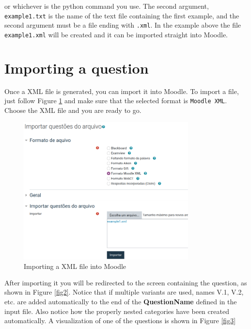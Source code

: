 \documentclass[11pt]{article}
\begin{document}
\noindent or whichever is the python command you use. The second argument, \texttt{example1.txt} is the name of the text file containing the first example, and the second argument must be a file ending with \texttt{.xml}. In the example above the file \texttt{example1.xml} will be created and it can be imported straight into Moodle.


\section{Importing a question}

Once a XML file is generated, you can import it into Moodle. To import a file, just follow Figure \ref{fig1} and make sure that the selected format is \texttt{Moodle XML}. Choose the XML file and  you are ready to go.

\begin{figure}[!htb]
\centering
  \includegraphics[width=0.8\textwidth]{figures/importing.png}
  \caption{Importing a XML file into Moodle}
  \label{fig1}
\end{figure}

After importing it you will be redirected to the screen containing the question, as shown in Figure \ref{fig2}. Notice that if multiple variants are used, names V.1, V.2, etc. are added automatically to the end of the {\bf QuestionName} defined in the input file. Also notice how the properly nested categories have been created automatically. A visualization of one of the questions is shown in Figure \ref{fig3}
\end{document}
